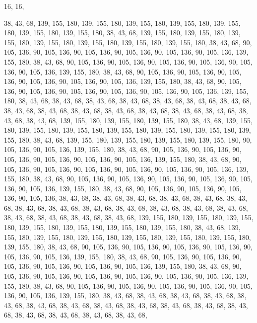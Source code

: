 16, 16,

38, 43, 68, 139, 155, 180, 139, 155, 180, 139, 155, 180, 139, 155, 180, 139,
155, 180, 139, 155, 180, 139, 155, 180, 38, 43, 68, 139, 155, 180, 139, 155,
180, 139, 155, 180, 139, 155, 180, 139, 155, 180, 139, 155, 180, 139, 155, 180,
38, 43, 68, 90, 105, 136, 90, 105, 136, 90, 105, 136, 90, 105, 136, 90,
105, 136, 90, 105, 136, 139, 155, 180, 38, 43, 68, 90, 105, 136, 90, 105,
136, 90, 105, 136, 90, 105, 136, 90, 105, 136, 90, 105, 136, 139, 155, 180,
38, 43, 68, 90, 105, 136, 90, 105, 136, 90, 105, 136, 90, 105, 136, 90,
105, 136, 90, 105, 136, 139, 155, 180, 38, 43, 68, 90, 105, 136, 90, 105,
136, 90, 105, 136, 90, 105, 136, 90, 105, 136, 90, 105, 136, 139, 155, 180,
38, 43, 68, 38, 43, 68, 38, 43, 68, 38, 43, 68, 38, 43, 68, 38,
43, 68, 38, 43, 68, 38, 43, 68, 38, 43, 68, 38, 43, 68, 38, 43,
68, 38, 43, 68, 38, 43, 68, 38, 43, 68, 38, 43, 68, 38, 43, 68,
139, 155, 180, 139, 155, 180, 139, 155, 180, 38, 43, 68, 139, 155, 180, 139,
155, 180, 139, 155, 180, 139, 155, 180, 139, 155, 180, 139, 155, 180, 139, 155,
180, 38, 43, 68, 139, 155, 180, 139, 155, 180, 139, 155, 180, 139, 155, 180,
90, 105, 136, 90, 105, 136, 139, 155, 180, 38, 43, 68, 90, 105, 136, 90,
105, 136, 90, 105, 136, 90, 105, 136, 90, 105, 136, 90, 105, 136, 139, 155,
180, 38, 43, 68, 90, 105, 136, 90, 105, 136, 90, 105, 136, 90, 105, 136,
90, 105, 136, 90, 105, 136, 139, 155, 180, 38, 43, 68, 90, 105, 136, 90,
105, 136, 90, 105, 136, 90, 105, 136, 90, 105, 136, 90, 105, 136, 139, 155,
180, 38, 43, 68, 90, 105, 136, 90, 105, 136, 90, 105, 136, 90, 105, 136,
38, 43, 68, 38, 43, 68, 38, 43, 68, 38, 43, 68, 38, 43, 68, 38,
43, 68, 38, 43, 68, 38, 43, 68, 38, 43, 68, 38, 43, 68, 38, 43,
68, 38, 43, 68, 38, 43, 68, 38, 43, 68, 38, 43, 68, 38, 43, 68,
38, 43, 68, 139, 155, 180, 139, 155, 180, 139, 155, 180, 139, 155, 180, 139,
155, 180, 139, 155, 180, 139, 155, 180, 38, 43, 68, 139, 155, 180, 139, 155,
180, 139, 155, 180, 139, 155, 180, 139, 155, 180, 139, 155, 180, 139, 155, 180,
38, 43, 68, 90, 105, 136, 90, 105, 136, 90, 105, 136, 90, 105, 136, 90,
105, 136, 90, 105, 136, 139, 155, 180, 38, 43, 68, 90, 105, 136, 90, 105,
136, 90, 105, 136, 90, 105, 136, 90, 105, 136, 90, 105, 136, 139, 155, 180,
38, 43, 68, 90, 105, 136, 90, 105, 136, 90, 105, 136, 90, 105, 136, 90,
105, 136, 90, 105, 136, 139, 155, 180, 38, 43, 68, 90, 105, 136, 90, 105,
136, 90, 105, 136, 90, 105, 136, 90, 105, 136, 90, 105, 136, 139, 155, 180,
38, 43, 68, 38, 43, 68, 38, 43, 68, 38, 43, 68, 38, 43, 68, 38,
43, 68, 38, 43, 68, 38, 43, 68, 38, 43, 68, 38, 43, 68, 38, 43,
68, 38, 43, 68, 38, 43, 68, 38, 43, 68, 38, 43, 68, 38, 43, 68,
